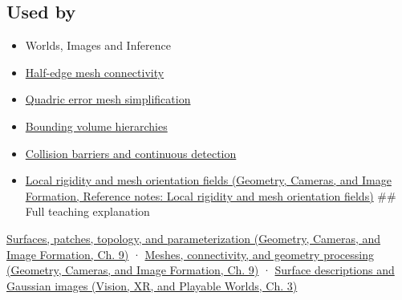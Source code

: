 \subsection{Used by}\label{appendix-fab348609369-used-by}

\hypertarget{appendix-fab348609369-used-by}{}

\begin{itemize}
\item
  {Worlds, Images and Inference}
\item
  \hyperref[appendix-1aea26b2307f]{Half-edge mesh connectivity}
\item
  \hyperref[appendix-1dd4ad54ca57]{Quadric error mesh simplification}
\item
  \hyperref[appendix-0b426c47dd78]{Bounding volume hierarchies}
\item
  \hyperref[appendix-a9ba01fa72a6]{Collision barriers and continuous detection}
\item
  \href{../03-Geometry-Cameras-and-Image-Formation/main.pdf\#nameddest=appendix-7107009c505b}{Local rigidity and mesh orientation fields (Geometry, Cameras, and Image Formation, Reference notes: Local rigidity and mesh orientation fields)} \#\# Full teaching explanation
\end{itemize}

\href{../03-Geometry-Cameras-and-Image-Formation/main.pdf\#nameddest=03-visual-computing-i-ch002-surfaces-patches-topology-and-parameterization}{Surfaces, patches, topology, and parameterization (Geometry, Cameras, and Image Formation, Ch. 9)} · \href{../03-Geometry-Cameras-and-Image-Formation/main.pdf\#nameddest=03-visual-computing-i-ch002-meshes-connectivity-and-geometry-processing}{Meshes, connectivity, and geometry processing (Geometry, Cameras, and Image Formation, Ch. 9)} · \href{../07-Vision-XR-and-Playable-Worlds/main.pdf\#nameddest=04-visual-computing-ii-ch032-surface-descriptions-and-gaussian-images}{Surface descriptions and Gaussian images (Vision, XR, and Playable Worlds, Ch. 3)}
